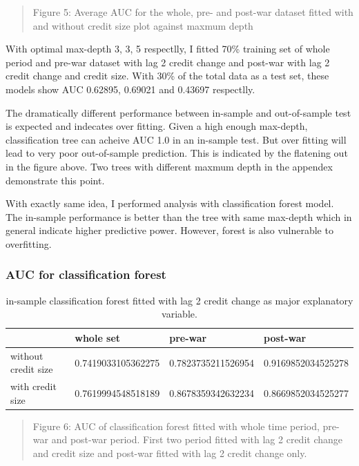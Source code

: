 \documentclass{article}
\newcommand{\ciapdf}[1]{\vspace*{-\parskip}\begin{center}\resizebox{0.75\textwidth}{!}{\texttt{[image: \#1]}}\end{center}}
\begin{document}
\ciapdf{Figure_6.pdf}
\begin{quote}
Figure 5: Average AUC for the whole, pre- and post-war dataset fitted
with and without credit size plot against maxmum depth
\end{quote}

With optimal max-depth 3, 3, 5 respectlly, I fitted 70\% training set of whole period and
pre-war dataset with lag 2 credit change and post-war with lag 2 credit
change and credit size. With 30\% of the total data as a test set, these models show AUC 0.62895,
0.69021 and 0.43697 respectlly.

The dramatically different performance between in-sample and
out-of-sample test is expected and indecates over fitting. Given a high enough
max-depth, classification tree can acheive AUC 1.0 in an in-sample test.
But over fitting will lead to very poor out-of-sample prediction. This
is indicated by the flatening out in the figure above. Two trees with different maxmum depth in the appendex demonstrate
this point.

With exactly same idea, I performed analysis with classification forest
model. The in-sample performance is better than the tree with same
max-depth which in general indicate higher predictive power. However, forest is also
vulnerable to overfitting.

\subsubsection*{AUC for classification forest}


\begin{table}[H]
    \caption{in-sample classification forest fitted with lag 2 credit change
    as major explanatory variable.}
    \begin{center}\begin{tabular}{|l|l|l|l|}
    \hline
                        & whole set          & pre-war            & post-war           \\ \hline
    without credit size & 0.7419033105362275 & 0.7823735211526954 & 0.9169852034525278 \\ \hline
    with credit size    & 0.7619994548518189 & 0.8678359342632234 & 0.8669852034525277 \\ \hline
    \end{tabular}\end{center}
\end{table}

\ciapdf{Figure_7.pdf}
\begin{quote}
Figure 6: AUC of classification forest fitted with whole time period,
pre-war and post-war period. First two period fitted with lag 2 credit
change and credit size and post-war fitted with lag 2 credit change
only.
\end{quote}
\end{document}
